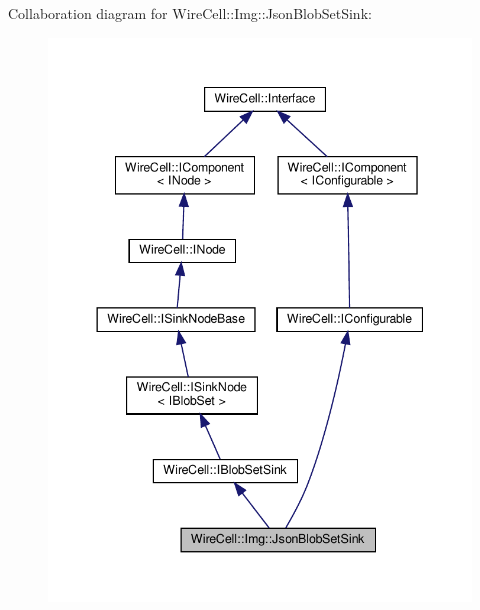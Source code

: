 Collaboration diagram for Wire\+Cell\+:\+:Img\+:\+:Json\+Blob\+Set\+Sink\+:
\nopagebreak
\begin{figure}[H]
\begin{center}
\leavevmode
\includegraphics[width=344pt]{class_wire_cell_1_1_img_1_1_json_blob_set_sink__coll__graph}
\end{center}
\end{figure}
